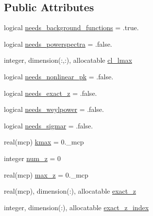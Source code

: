 \subsection*{Public Attributes}
\begin{DoxyCompactItemize}
\item 
logical \mbox{\hyperlink{structcosmologytypes_1_1tcosmologyrequirementslikelihood_ab4546dcab603817540138655d68e17a9}{needs\+\_\+background\+\_\+functions}} = .true.
\item 
logical \mbox{\hyperlink{structcosmologytypes_1_1tcosmologyrequirementslikelihood_a5d40f863bb92749cd31ecf58d42d10b8}{needs\+\_\+powerspectra}} = .false.
\item 
integer, dimension(\+:,\+:), allocatable \mbox{\hyperlink{structcosmologytypes_1_1tcosmologyrequirementslikelihood_a4227b547ca2a1f3dce711c01298919a3}{cl\+\_\+lmax}}
\item 
logical \mbox{\hyperlink{structcosmologytypes_1_1tcosmologyrequirementslikelihood_a40c70935374a839c898fedde6c5866ad}{needs\+\_\+nonlinear\+\_\+pk}} = .false.
\item 
logical \mbox{\hyperlink{structcosmologytypes_1_1tcosmologyrequirementslikelihood_a4d66e1516d27812afd785902b3c2eeaf}{needs\+\_\+exact\+\_\+z}} = .false.
\item 
logical \mbox{\hyperlink{structcosmologytypes_1_1tcosmologyrequirementslikelihood_ab1e5415b92ded9d3eecff9f4d3593e24}{needs\+\_\+weylpower}} = .false.
\item 
logical \mbox{\hyperlink{structcosmologytypes_1_1tcosmologyrequirementslikelihood_a91b9605be118101d01d49a9c8a4e8e9c}{needs\+\_\+sigmar}} = .false.
\item 
real(mcp) \mbox{\hyperlink{structcosmologytypes_1_1tcosmologyrequirementslikelihood_ac4213f965280d553517590ac4a22ac87}{kmax}} = 0.\+\_\+mcp
\item 
integer \mbox{\hyperlink{structcosmologytypes_1_1tcosmologyrequirementslikelihood_a34ad1a7f2fa1b20a25dfde990a9a76a3}{num\+\_\+z}} = 0
\item 
real(mcp) \mbox{\hyperlink{structcosmologytypes_1_1tcosmologyrequirementslikelihood_a7396563bfe778260ade8a680dcc3ebb6}{max\+\_\+z}} = 0.\+\_\+mcp
\item 
real(mcp), dimension(\+:), allocatable \mbox{\hyperlink{structcosmologytypes_1_1tcosmologyrequirementslikelihood_a4d79e15abaee36968625edfc224bcd6c}{exact\+\_\+z}}
\item 
integer, dimension(\+:), allocatable \mbox{\hyperlink{structcosmologytypes_1_1tcosmologyrequirementslikelihood_a5ba663960ff673c8215c048d9ccf5d32}{exact\+\_\+z\+\_\+index}}
\end{DoxyCompactItemize}


